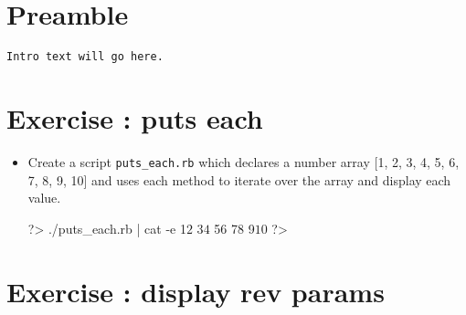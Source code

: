 \documentclass{42-en}
\begin{document}
\chapter{Preamble}

\begin{verbatim}
Intro text will go here.
\end{verbatim}

\startexercices


\chapter{Exercise \exercicenumber: puts each}

\exnumber{\exercicenumber}

\makeheaderfiles

\begin{itemize}

\item Create a script \texttt{puts_each.rb} which declares a number array [1, 2,
3, 4, 5, 6, 7, 8, 9, 10] and uses each method to iterate over the array and
display each value.

\begin{42console}
	?> ./puts_each.rb | cat -e
	1$
	2$
	3$
	4$
	5$
	6$
	7$
	8$
	9$
	10$
	?>
\end{42console}

\end{itemize}



\chapter{Exercise \exercicenumber: display rev params}
\end{document}
